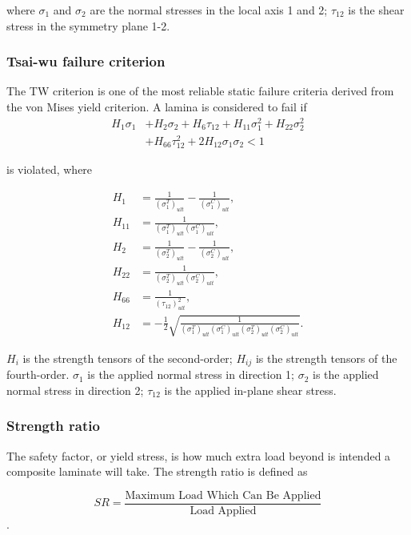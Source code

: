 where $\sigma_1$ and $\sigma_2$ are the normal stresses in the local axis 1 and 2;
$\tau_{12}$ is the shear stress in the symmetry plane 1-2.

\subsubsection{Tsai-wu failure criterion}
The TW criterion is one of the most reliable static failure criteria derived from the von
Mises yield criterion.  
A lamina is considered to fail
if \begin{equation} \label{eq:tsai_wu}
\begin{split}
	H_1 \sigma_1  & + H_2 \sigma_2 + H_6 \tau_{12} + H_{11}\sigma_1^2 + H_{22} \sigma_2^2 \\
				  & + H_{66}  \tau_{12}^2 + 2H_{12}\sigma_1\sigma_2 < 1
\end{split}
\end{equation}

is violated, where

\begin{equation}
	\begin{split}
		H_{1}&=\frac{1}{\left(\sigma_{1}^{T}\right)_{u l t}}-\frac{1}{\left(\sigma_{1}^{C}\right)_{u l t}}\textstyle{,} \\
		H_{11}&=\frac{1}{\left(\sigma_{1}^{T}\right)_{u l t}\left(\sigma_{1}^{C}\right)_{u l t}} \textstyle{,}\\
		H_{2}&=\frac{1}{\left(\sigma_{2}^{T}\right)_{u l t}}-\frac{1}{\left(\sigma_{2}^{C}\right)_{u l t}} \textstyle{,}\\
		H_{22}&=\frac{1}{\left(\sigma_{2}^{T}\right)_{u l t}\left(\sigma_{2}^{C}\right)_{u l t}} \textstyle{,}\\
		H_{66}&=\frac{1}{\left(\tau_{12}\right)_{u l t}^{2}} \textstyle{,}\\
		H_{12}&=-\frac{1}{2} \sqrt{\frac{1}{\left(\sigma_{1}^{T}\right)_{u l
		t}\left(\sigma_{1}^{C}\right)_{u l t}\left(\sigma_{2}^{T}\right)_{u l
		t}\left(\sigma_{2}^{C}\right)_{u l t}}}\textstyle{.}
	\end{split}
\end{equation}

$H_i$ is the strength tensors of the second-order; $H_{ij}$ is the strength
tensors of the fourth-order. $\sigma_1$ is the applied normal stress in 
direction 1; $\sigma_2$ is the applied normal stress in direction 2; 
$\tau_{12}$ is the applied in-plane shear stress.




\subsubsection{Strength ratio}
The safety factor, or yield stress, is how much extra load beyond is intended a
composite laminate will take. The strength ratio is defined as 

\begin{equation}
	\label{eq:sr}S R=\frac{\text {Maximum Load Which Can Be Applied}}{\text {Load Applied}}
\end{equation}.
